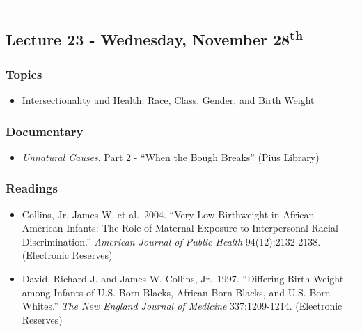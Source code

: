 \documentclass[]{book}
\providecommand{\tightlist}{%
  \setlength{\itemsep}{0pt}\setlength{\parskip}{0pt}}
\theoremstyle{definition}
\theoremstyle{definition}
\theoremstyle{definition}
\theoremstyle{remark}
\begin{document}
\begin{center}\rule{0.5\linewidth}{\linethickness}\end{center}

\hypertarget{lecture-23---wednesday-november-28th}{%
\subsection*{\texorpdfstring{Lecture 23 - Wednesday, November
28\textsuperscript{th}}{Lecture 23 - Wednesday, November 28th}}\label{lecture-23---wednesday-november-28th}}

\hypertarget{topics-27}{%
\subsubsection*{Topics}\label{topics-27}}

\begin{itemize}
\tightlist
\item
  Intersectionality and Health: Race, Class, Gender, and Birth Weight
\end{itemize}

\hypertarget{documentary-4}{%
\subsubsection*{Documentary}\label{documentary-4}}

\begin{itemize}
\tightlist
\item
  \emph{Unnatural Causes}, Part 2 - ``When the Bough Breaks'' (Pius
  Library)
\end{itemize}

\hypertarget{readings-25}{%
\subsubsection*{Readings}\label{readings-25}}

\begin{itemize}
\tightlist
\item
  Collins, Jr, James W. et al.~2004. ``Very Low Birthweight in African
  American Infants: The Role of Maternal Exposure to Interpersonal
  Racial Discrimination.'' \emph{American Journal of Public Health}
  94(12):2132-2138. (Electronic Reserves)
\item
  David, Richard J. and James W. Collins, Jr.~1997. ``Differing Birth
  Weight among Infants of U.S.-Born Blacks, African-Born Blacks, and
  U.S.-Born Whites.'' \emph{The New England Journal of Medicine}
  337:1209-1214. (Electronic Reserves)
\end{itemize}
\end{document}
